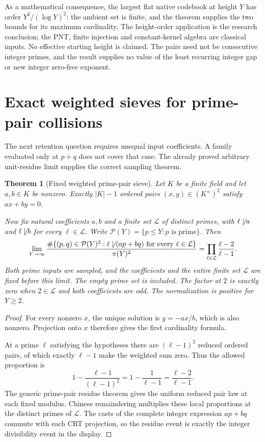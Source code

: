 \documentclass[11pt]{article}
\newtheorem{theorem}{Theorem}[section]
\begin{document}
As a mathematical consequence, the largest flat native codebook at
height \(Y\) has order \(Y^2/(\log Y)^2\): the ambient set is finite,
and the theorem supplies the two bounds for its maximum cardinality.
The height-order application is the research conclusion; the PNT,
finite injection and constant-kernel algebra are classical inputs.
No effective starting height is claimed. The pairs need not be
consecutive integer primes, and the result supplies no value of
the least recurring integer gap or new integer zero-free exponent.

\section{Exact weighted sieves for prime-pair collisions}
\label{sec:weighted-native-sieve}

The next retention question requires unequal input coefficients.
A family evaluated only at \(p+q\) does not cover that case.
The already proved arbitrary unit-residue limit supplies the correct
sampling theorem.

\begin{theorem}[Fixed weighted prime-pair sieve]
\label{thm:weighted-prime-pair-sieve}
Let \(K\) be a finite field and let \(a,b\in K\) be nonzero.
Exactly \(|K|-1\) ordered pairs \((x,y)\in(K^\times)^2\) satisfy
\(ax+by=0\).

Now fix natural coefficients \(a,b\) and a finite set
\(\mathcal L\) of distinct primes, with
\(\ell\not\mid a\) and \(\ell\not\mid b\) for every
\(\ell\in\mathcal L\). Write
\(\mathcal P(Y)=\{p\le Y:p\text{ is prime}\}\).
Then
\[
 \lim_{Y\to\infty}
 \frac{\#\{(p,q)\in\mathcal P(Y)^2:
       \ell\not\mid(ap+bq)\ \text{for every }\ell\in\mathcal L\}}
      {\pi(Y)^2}
   =\prod_{\ell\in\mathcal L}\frac{\ell-2}{\ell-1}.
\]
Both prime inputs are sampled, and the coefficients and the entire
finite set \(\mathcal L\) are fixed before this limit.
The empty prime set is included. The factor at \(2\) is exactly
zero when \(2\in\mathcal L\) and both coefficients are odd.
The normalization is positive for \(Y\ge2\).
\end{theorem}

\begin{proof}
For every nonzero \(x\), the unique solution is
\(y=-a x/b\), which is also nonzero. Projection onto \(x\)
therefore gives the first cardinality formula.

At a prime \(\ell\) satisfying the hypotheses there are
\((\ell-1)^2\) reduced ordered pairs, of which exactly
\(\ell-1\) make the weighted sum zero. Thus the allowed
proportion is
\[
 1-\frac{\ell-1}{(\ell-1)^2}
       =1-\frac1{\ell-1}=\frac{\ell-2}{\ell-1}.
\]
The generic prime-pair residue theorem gives the uniform reduced
pair law at each fixed modulus. Chinese remaindering multiplies
these local proportions at the distinct primes of \(\mathcal L\).
The casts of the complete integer expression \(ap+bq\) commute
with each CRT projection, so the residue event is exactly the
integer divisibility event in the display.
\end{proof}
\end{document}
